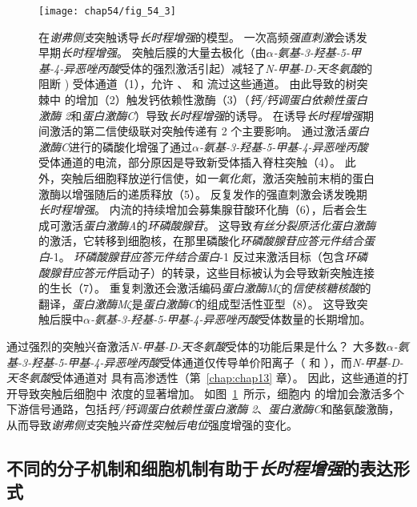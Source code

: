\begin{figure}[htbp]
	\centering
	\texttt{[image: chap54/fig\_54\_3]}
	\caption{在\textit{谢弗侧支}突触诱导\textit{长时程增强}的模型。
		一次高频\textit{强直刺激}会诱发早期\textit{长时程增强}。
		突触后膜的大量去极化（由\textit{$\alpha$-氨基-3-羟基-5-甲基-4-异恶唑丙酸}受体的强烈激活引起）减轻了\textit{N-甲基-D-天冬氨酸}的  阻断 ) 受体通道（1），允许 、 和  流过这些通道。
		由此导致的树突棘中  的增加（2）触发钙依赖性激酶（3）（\textit{钙/钙调蛋白依赖性蛋白激酶 2}和\textit{蛋白激酶C}）导致\textit{长时程增强}的诱导。
		在诱导\textit{长时程增强}期间激活的第二信使级联对突触传递有 2 个主要影响。
		通过激活\textit{蛋白激酶C}进行的磷酸化增强了通过\textit{$\alpha$-氨基-3-羟基-5-甲基-4-异恶唑丙酸}受体通道的电流，部分原因是导致新受体插入脊柱突触（4）。
		此外，突触后细胞释放逆行信使，如\textit{一氧化氮}，激活突触前末梢的蛋白激酶以增强随后的递质释放（5）。
		反复发作的强直刺激会诱发晚期\textit{长时程增强}。
		 内流的持续增加会募集腺苷酸环化酶（6），后者会生成可激活\textit{蛋白激酶A}的\textit{环磷酸腺苷}。
		这导致\textit{有丝分裂原活化蛋白激酶}的激活，它转移到细胞核，在那里磷酸化\textit{环磷酸腺苷应答元件结合蛋白}-1。
		\textit{环磷酸腺苷应答元件结合蛋白}-1 反过来激活目标（包含\textit{环磷酸腺苷应答元件}启动子）的转录，这些目标被认为会导致新突触连接的生长（7）。
		重复刺激还会激活编码\textit{蛋白激酶M$\zeta$}的\textit{信使核糖核酸}的翻译，\textit{蛋白激酶M$\zeta$}是\textit{蛋白激酶C}的组成型活性亚型（8）。
		这导致突触后膜中\textit{$\alpha$-氨基-3-羟基-5-甲基-4-异恶唑丙酸}受体数量的长期增加。}
	\label{fig:54_3}
\end{figure}


通过强烈的突触兴奋激活\textit{N-甲基-D-天冬氨酸}受体的功能后果是什么？
大多数\textit{$\alpha$-氨基-3-羟基-5-甲基-4-异恶唑丙酸}受体通道仅传导单价阳离子（ 和 ），而\textit{N-甲基-D-天冬氨酸}受体通道对  具有高渗透性（第~\ref{chap:chap13} 章）。
因此，这些通道的打开导致突触后细胞中  浓度的显著增加。
如图~\ref{fig:54_3}~所示，细胞内  的增加会激活多个下游信号通路，包括\textit{钙/钙调蛋白依赖性蛋白激酶 2}、\textit{蛋白激酶C}和酪氨酸激酶，从而导致\textit{谢弗侧支}突触\textit{兴奋性突触后电位}强度增强的变化。



\subsection{不同的分子机制和细胞机制有助于\textit{长时程增强}的表达形式}

